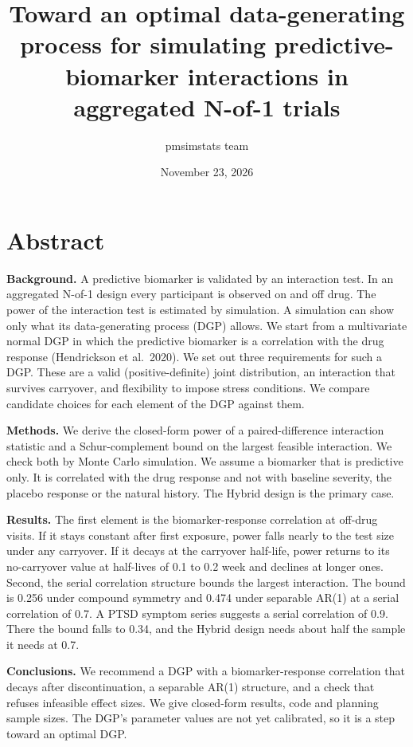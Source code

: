 \documentclass[
  11pt,
]{article}
\title{Toward an optimal data-generating process for simulating predictive-biomarker interactions in aggregated N-of-1 trials}
\author{pmsimstats team}
\date{November 23, 2026}
\begin{document}
\maketitle

{
\setcounter{tocdepth}{2}
\tableofcontents
}
\listoffigures
\listoftables
{}
\section*{Abstract}\label{abstract}

\textbf{Background.} A predictive biomarker is validated by an interaction
test. In an aggregated N-of-1 design every participant is observed on
and off drug. The power of the interaction test is estimated by
simulation. A simulation can show only what its data-generating
process (DGP) allows. We start from a multivariate normal DGP in which
the predictive biomarker is a correlation with the drug response
(Hendrickson et al.~2020). We set out three requirements for such a
DGP. These are a valid (positive-definite) joint distribution, an
interaction that survives carryover, and flexibility to impose stress
conditions. We compare candidate choices for each element of the DGP
against them.

\textbf{Methods.} We derive the closed-form power of a paired-difference
interaction statistic and a Schur-complement bound on the largest
feasible interaction. We check both by Monte Carlo simulation. We
assume a biomarker that is predictive only. It is correlated with the
drug response and not with baseline severity, the placebo response or
the natural history. The Hybrid design is the primary case.

\textbf{Results.} The first element is the biomarker-response correlation
at off-drug visits. If it stays constant after first exposure, power
falls nearly to the test size under any carryover. If it decays at the
carryover half-life, power returns to its no-carryover value at
half-lives of 0.1 to 0.2 week and declines at longer ones. Second, the
serial correlation structure bounds the largest interaction. The bound
is 0.256 under compound symmetry and 0.474 under separable AR(1) at a
serial correlation of 0.7. A PTSD symptom series suggests a serial
correlation of 0.9. There the bound falls to 0.34, and the Hybrid
design needs about half the sample it needs at 0.7.

\textbf{Conclusions.} We recommend a DGP with a biomarker-response
correlation that decays after discontinuation, a separable AR(1)
structure, and a check that refuses infeasible effect sizes. We give
closed-form results, code and planning sample sizes. The DGP's
parameter values are not yet calibrated, so it is a step toward an
optimal DGP.
\end{document}
